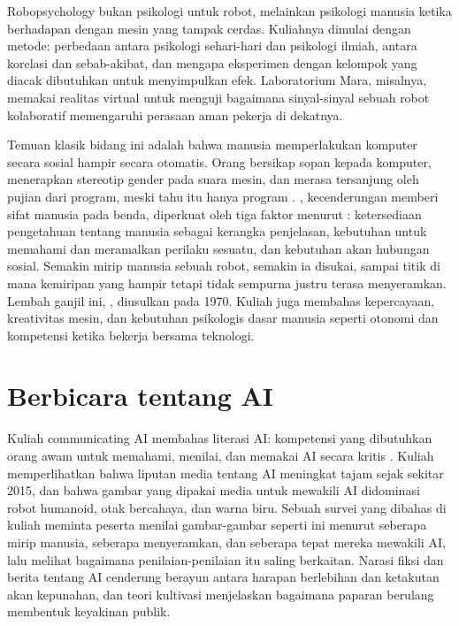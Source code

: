 Robopsychology bukan psikologi untuk robot, melainkan psikologi manusia ketika berhadapan dengan mesin
yang tampak cerdas. Kuliahnya dimulai dengan metode: perbedaan antara psikologi sehari-hari dan psikologi
ilmiah, antara korelasi dan sebab-akibat, dan mengapa eksperimen dengan kelompok yang diacak dibutuhkan
untuk menyimpulkan efek. Laboratorium Mara, misalnya, memakai realitas virtual untuk menguji bagaimana
sinyal-sinyal sebuah robot kolaboratif memengaruhi perasaan aman pekerja di dekatnya.

Temuan klasik bidang ini adalah bahwa manusia memperlakukan komputer secara sosial hampir secara
otomatis. Orang bersikap sopan kepada komputer, menerapkan stereotip gender pada suara mesin, dan merasa
tersanjung oleh pujian dari program, meski tahu itu hanya program \citep{reeves1996,nass2000}.
, kecenderungan memberi sifat manusia pada benda, diperkuat oleh tiga faktor
menurut \citet{epley2007}: ketersediaan pengetahuan tentang manusia sebagai kerangka penjelasan,
kebutuhan untuk memahami dan meramalkan perilaku sesuatu, dan kebutuhan akan hubungan sosial. Semakin mirip
manusia sebuah robot, semakin ia disukai, sampai titik di mana kemiripan yang hampir tetapi tidak sempurna
justru terasa menyeramkan. Lembah ganjil ini, , diusulkan \citet{mori2012} pada 1970.
Kuliah juga membahas kepercayaan, kreativitas mesin, dan kebutuhan psikologis dasar manusia seperti
otonomi dan kompetensi ketika bekerja bersama teknologi.

\section{Berbicara tentang AI}

Kuliah communicating AI membahas literasi AI: kompetensi yang dibutuhkan orang awam untuk memahami,
menilai, dan memakai AI secara kritis \citep{long2020}. Kuliah memperlihatkan bahwa liputan media tentang
AI meningkat tajam sejak sekitar 2015, dan bahwa gambar yang dipakai media untuk mewakili AI didominasi
robot humanoid, otak bercahaya, dan warna biru. Sebuah survei yang dibahas di kuliah meminta peserta
menilai gambar-gambar seperti ini menurut seberapa mirip manusia, seberapa menyeramkan, dan seberapa
tepat mereka mewakili AI, lalu melihat bagaimana penilaian-penilaian itu saling berkaitan.
Narasi fiksi dan berita tentang AI cenderung berayun antara harapan berlebihan dan ketakutan akan
kepunahan, dan teori kultivasi menjelaskan bagaimana paparan berulang membentuk keyakinan publik.

